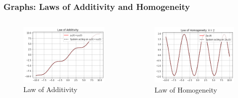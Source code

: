 \documentclass{beamer}
\begin{document}
\begin{frame}
  \frametitle{Graphs: Laws of Additivity and Homogeneity}
 \begin{columns}
\begin{column}{0.5\textwidth}
\begin{figure}
\begin{flushleft}
\includegraphics[width=\columnwidth]{graphs/law_of_additivity.png}
 \caption{Law of Additivity}
\end{flushleft}
\end{figure}
\end{column}
\begin{column}{0.5\textwidth}
\begin{figure}
\begin{flushleft}
\includegraphics[width=\columnwidth]{graphs/law_of_homogeneity.png}
 \caption{Law of Homogeneity}
\end{flushleft}
\end{figure}
\end{column}
\end{columns}
\end{frame}
\end{document}
